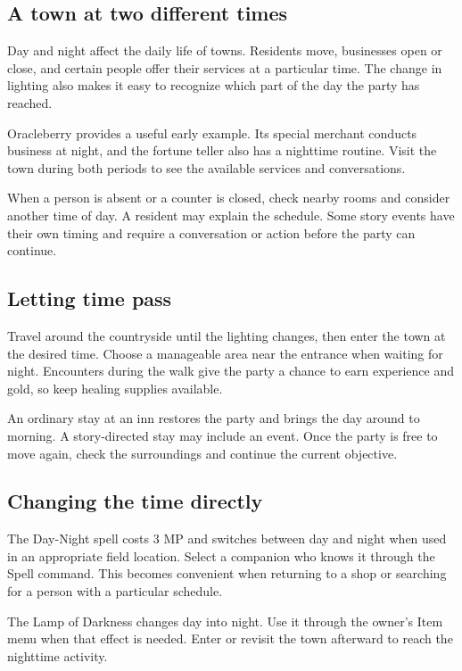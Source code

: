 \subsection*{A town at two different times}

Day and night affect the daily life of towns. Residents move, businesses
open or close, and certain people offer their services at a particular
time. The change in lighting also makes it easy to recognize which part
of the day the party has reached.

Oracleberry provides a useful early example. Its special merchant conducts
business at night, and the fortune teller also has a nighttime routine.
Visit the town during both periods to see the available services and
conversations.

When a person is absent or a counter is closed, check nearby rooms and
consider another time of day. A resident may explain the schedule. Some
story events have their own timing and require a conversation or action
before the party can continue.

\subsection*{Letting time pass}

Travel around the countryside until the lighting changes, then enter
the town at the desired time. Choose a manageable area near the entrance
when waiting for night. Encounters during the walk give the party a chance
to earn experience and gold, so keep healing supplies available.

An ordinary stay at an inn restores the party and brings the day around
to morning. A story-directed stay may include an event. Once the party
is free to move again, check the surroundings and continue the current
objective.

\subsection*{Changing the time directly}

The Day-Night spell costs 3 MP and switches between day and night when
used in an appropriate field location. Select a companion who knows it
through the Spell command. This becomes convenient when returning to a
shop or searching for a person with a particular schedule.

The Lamp of Darkness changes day into night. Use it through the owner's
Item menu when that effect is needed. Enter or revisit the town afterward
to reach the nighttime activity.

